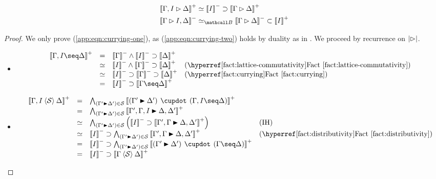 \begin{lemma}
  \begin{align}
    \psint{\Gamma, I \J \Delta} &\semequiv \nsint{I} \limp \psint{\Gamma \J \Delta} \label{app:eqn:currying-one} \\
    \nsint{\Gamma \J I, \Delta} &\semequiv_{\Brouwer} \nsint{\Gamma \J \Delta} \lsub \psint{I} \label{app:eqn:currying-two}
  \end{align}
\end{lemma}
\begin{proof}
  We only prove (\ref{app:eqn:currying-one}), as (\ref{app:eqn:currying-two}) holds by
  duality as in . We proceed by recurrence on
  $\left|\mathbin{\rhd}\right|$.
  \begin{itemize}
    \item[\bcase]
    $$
    \begin{array}{rcll}
      \psint{\Gamma, I \seq \Delta}
      &=& \nsint{\Gamma} \land \nsint{I} \limp \psint{\Delta} & \\
      &\semequiv& \nsint{I} \land \nsint{\Gamma} \limp \psint{\Delta} &\text{(\reffact{lattice-commutativity})} \\
      &\semequiv& \nsint{I} \limp \nsint{\Gamma} \limp \psint{\Delta} &\text{(\reffact{currying})} \\
      &=& \nsint{I} \limp \psint{\Gamma \seq \Delta} & \\
    \end{array}
    $$
    \item[\rcase]
    $$
    \begin{array}{rcll}
      \psint{\Gamma, I \piq{\cS} \Delta}
      &=& \psintAndMix{(\Gamma' \JB \Delta')}{\cS}{\Gamma, I}{\Delta} & \\
      &=& \psintAnd{(\Gamma' \JB \Delta')}{\cS}{\Gamma', \Gamma, I \JB \Delta, \Delta'} & \\
      &\semequiv& \bigwedge_{(\Gamma' \JB \Delta') \in \cS}{\left(\nsint{I} \limp \psint{\Gamma', \Gamma \JB \Delta, \Delta'}\right)} &\text{(IH)} \\
      &\semequiv& \nsint{I} \limp \bigwedge_{(\Gamma' \JB \Delta') \in \cS}{\psint{\Gamma', \Gamma \JB \Delta, \Delta'}} &\text{(\reffact{distributivity})} \\
      &=& \nsint{I} \limp \bigwedge_{(\Gamma' \JB \Delta') \in \cS}{\psint{(\Gamma' \JB \Delta') \mix (\Gamma \seq \Delta)}} & \\
      &=& \nsint{I} \limp \psint{\Gamma \piq{\cS} \Delta} & \\
    \end{array}
    $$
  \end{itemize}
\end{proof}

